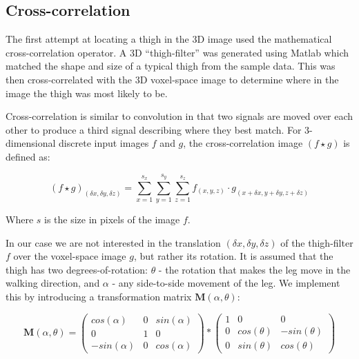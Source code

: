 \subsection{Cross-correlation}

The first attempt at locating a thigh in the 3D image used the mathematical cross-correlation operator.
A 3D ``thigh-filter'' was generated using Matlab which matched the shape and size of a typical thigh from the sample data.
This was then cross-correlated with the 3D voxel-space image to determine where in the image the thigh was most likely to be.

\bigskip
\noindent Cross-correlation is similar to convolution in that two signals are moved over each other to produce a third signal describing where they best match.
For 3-dimensional discrete input images $f$ and $g$, the cross-correlation image $(f \star g)$ is defined as:

\begin{equation}
	(f \star g)_{(\delta x,\delta y,\delta z)} = \sum_{x=1}^{s_{x}} \sum_{y=1}^{s_{y}} \sum_{z=1}^{s_{z}} f_{(x,y,z)} \cdot g_{(x+\delta x,y+\delta y, z+\delta z)}
\end{equation}

Where $s$ is the size in pixels of the image $f$.

In our case we are not interested in the translation $(\delta x,\delta y,\delta z)$ of the thigh-filter $f$ over the voxel-space image $g$, but rather its rotation.
It is assumed that the thigh has two degrees-of-rotation: $\theta$ - the rotation that makes the leg move in the walking direction, and $\alpha$ - any side-to-side movement of the leg.
We implement this by introducing a transformation matrix $\mathbf{M}(\alpha,\theta)$:

\begin{equation}
	\mathbf{M}(\alpha,\theta) =
	\left(\begin{array}{ccc}
		cos(\alpha) & 0 & sin(\alpha) \\
		0 & 1 & 0 \\
		-sin(\alpha) & 0 & cos(\alpha)
	\end{array} \right)
	*
	\left(\begin{array}{ccc}
		1 & 0 & 0 \\
		0 & cos(\theta) & -sin(\theta) \\
		0 & sin(\theta) & cos(\theta)
	\end{array} \right)
	\label{eqn:Matrix}
\end{equation}


